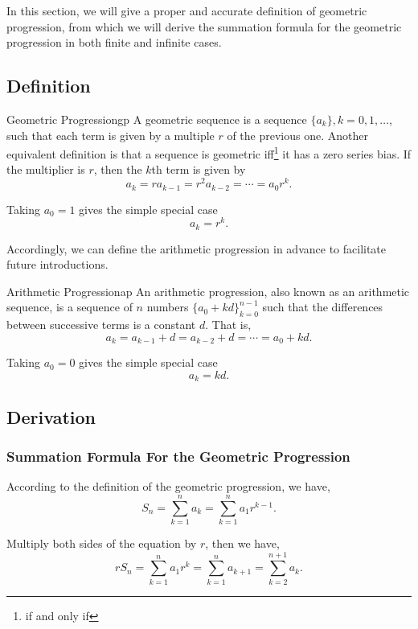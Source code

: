 In this section, we will give a proper and accurate definition of geometric progression, from which we will derive the summation formula for the geometric progression in both finite and infinite cases.

\subsection{Definition}
\begin{defnbox}{Geometric Progression\cite{Weisstein2019gp}}{gp}
    A geometric sequence is a sequence $\{a_k\}, k=0, 1, \ldots$, such that each term is given by a multiple $r$ of the previous one. Another equivalent definition is that a sequence is geometric iff\footnote{if and only if} it has a zero series bias. If the multiplier is $r$, then the $k$th term is given by
    \[
        a_k = ra_{k-1} = r^2a_{k-2} = \cdots = a_0r^k.
    \]

    Taking $a_0=1$ gives the simple special case
    \[
        a_k = r^k.
    \]
\end{defnbox}

Accordingly, we can define the arithmetic progression in advance to facilitate future introductions.
\begin{defnbox}{Arithmetic Progression\cite{Weisstein2019ap}}{ap}
    An arithmetic progression, also known as an arithmetic sequence, is a sequence of $n$ numbers $\{a_0+kd\}^{n-1}_{k=0}$ such that the differences between successive terms is a constant $d$. That is,
    \[
        a_k = a_{k-1}+d = a_{k-2}+d = \cdots = a_0+kd.
    \]

    Taking $a_0=0$ gives the simple special case
    \[
        a_k = kd.
    \]
\end{defnbox}


\subsection{Derivation}
\subsubsection{Summation Formula For the Geometric Progression}
According to the definition of the geometric progression, we have,
\begin{equation}\label{E:gp-1}
    S_n = \sum_{k=1}^{n} a_k = \sum_{k=1}^{n} a_1 r^{k-1}.
\end{equation}

Multiply both sides of the equation by $r$, then we have,
\begin{equation}\label{E:gp-2}
    rS_n = \sum_{k=1}^{n} a_1 r^{k} = \sum_{k=1}^{n} a_{k+1} = \sum_{k=2}^{n+1} a_k.
\end{equation}

